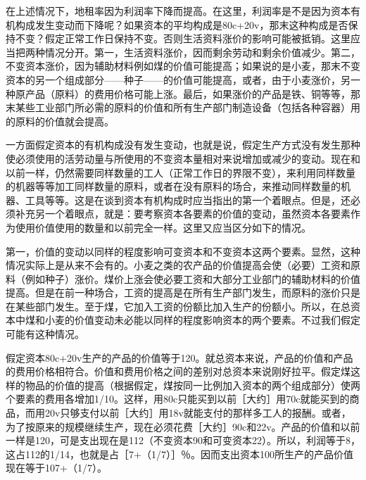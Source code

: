 在上述情况下，地租率因为利润率下降而提高。在这里，利润率是不是因为资本有机构成发生变动而下降呢？如果资本的平均构成是80c+20v，那末这种构成是否保持不变？假定正常工作日保持不变。否则生活资料涨价的影响可能被抵销。这里应当把两种情况分开。第一，生活资料涨价，因而剩余劳动和剩余价值减少。第二，不变资本涨价，因为辅助材料例如煤的价值可能提高；如果说的是小麦，那末不变资本的另一个组成部分——种子——的价值可能提高，或者，由于小麦涨价，另一种原产品（原料）的费用价格可能上涨。最后，如果涨价的产品是铁、铜等等，那末某些工业部门所必需的原料的价值和所有生产部门制造设备（包括各种容器）用的原料的价值就会提高。

一方面假定资本的有机构成没有发生变动，也就是说，假定生产方式没有发生那种使必须使用的活劳动量与所使用的不变资本量相对来说增加或减少的变动。现在和以前一样，仍然需要同样数量的工人（正常工作日的界限不变），来利用同样数量的机器等等加工同样数量的原料，或者在没有原料的场合，来推动同样数量的机器、工具等等。这是在谈到资本有机构成时应当指出的第一个着眼点。但是，还必须补充另一个着眼点，就是：要考察资本各要素的价值的变动，虽然资本各要素作为使用价值使用的数量和以前完全一样。这里又应当区分如下的情况。

第一，价值的变动以同样的程度影响可变资本和不变资本这两个要素。显然，这种情况实际上是从来不会有的。小麦之类的农产品的价值提高会使（必要）工资和原料（例如种子）涨价。煤价上涨会使必要工资和大部分工业部门的辅助材料的价值提高。但是在前一种场合，工资的提高是在所有生产部门发生，而原料的涨价只是在某些部门发生。至于煤，它加入工资的份额比加入生产的份额小。所以，在总资本中煤和小麦的价值变动未必能以同样的程度影响资本的两个要素。不过我们假定可能有这种情况。

假定资本80c+20v生产的产品的价值等于120。就总资本来说，产品的价值和产品的费用价格相符合。价值和费用价格之间的差别对总资本来说刚好拉平。假定煤这样的物品的价值的提高（根据假定，煤按同一比例加入资本的两个组成部分）使两个要素的费用各增加1/10。这样，用80c只能买到以前［大约］用70c就能买到的商品，而用20v只够支付以前［大约］用18v就能支付的那样多工人的报酬。或者，为了按原来的规模继续生产，现在必须花费［大约］90c和22v。产品的价值和以前一样是120，可是支出现在是112（不变资本90和可变资本22）。所以，利润等于8，这占112的1/14，也就是占［7+（1/7）］％。因而支出资本100所生产的产品价值现在等于107+（1/7）。

